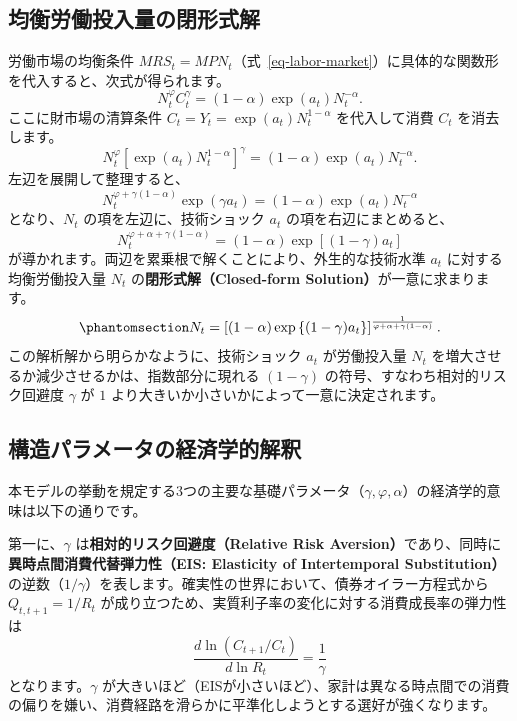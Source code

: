\documentclass[
  japanese,
  lualatex,
  ja=standard,
  12pt,
  a4paper]{ltjsarticle}
\begin{document}
\subsection{均衡労働投入量の閉形式解}\label{ux5747ux8861ux52b4ux50cdux6295ux5165ux91cfux306eux9589ux5f62ux5f0fux89e3}

労働市場の均衡条件
\(MRS_t = MPN_t\)（式~\ref{eq-labor-market}）に具体的な関数形を代入すると、次式が得られます。
\[
N_t^\varphi C_t^\gamma = (1-\alpha) \exp(a_t) N_t^{-\alpha}.
\] ここに財市場の清算条件 \(C_t = Y_t = \exp(a_t) N_t^{1-\alpha}\)
を代入して消費 \(C_t\) を消去します。 \[
N_t^\varphi \left[ \exp(a_t) N_t^{1-\alpha} \right]^\gamma = (1-\alpha) \exp(a_t) N_t^{-\alpha}.
\] 左辺を展開して整理すると、 \[
N_t^{\varphi + \gamma(1-\alpha)} \exp(\gamma a_t) = (1-\alpha) \exp(a_t) N_t^{-\alpha}
\] となり、\(N_t\) の項を左辺に、技術ショック \(a_t\)
の項を右辺にまとめると、 \[
N_t^{\varphi + \alpha + \gamma(1-\alpha)} = (1-\alpha) \exp\left[ (1-\gamma) a_t \right]
\] が導かれます。両辺を累乗根で解くことにより、外生的な技術水準 \(a_t\)
に対する均衡労働投入量 \(N_t\) の\textbf{閉形式解（Closed-form
Solution）}が一意に求まります。
\begin{equation}\protect\phantomsection\label{eq-labor-level}{
N_t = \left[ (1-\alpha) \exp\left\{ (1-\gamma) a_t \right\} \right]^{\frac{1}{\varphi + \alpha + \gamma(1-\alpha)}}.
}\end{equation} この解析解から明らかなように、技術ショック \(a_t\)
が労働投入量 \(N_t\) を増大させるか減少させるかは、指数部分に現れる
\((1-\gamma)\) の符号、すなわち相対的リスク回避度 \(\gamma\) が \(1\)
より大きいか小さいかによって一意に決定されます。

\subsection{構造パラメータの経済学的解釈}\label{ux69cbux9020ux30d1ux30e9ux30e1ux30fcux30bfux306eux7d4cux6e08ux5b66ux7684ux89e3ux91c8}

本モデルの挙動を規定する3つの主要な基礎パラメータ（\(\gamma, \varphi, \alpha\)）の経済学的意味は以下の通りです。

第一に、\(\gamma\) は\textbf{相対的リスク回避度（Relative Risk
Aversion）}であり、同時に\textbf{異時点間消費代替弾力性（EIS: Elasticity
of Intertemporal
Substitution）}の逆数（\(1/\gamma\)）を表します。確実性の世界において、債券オイラー方程式から
\(Q_{t,t+1} = 1/R_t\)
が成り立つため、実質利子率の変化に対する消費成長率の弾力性は \[
\frac{d\ln(C_{t+1}/C_t)}{d\ln R_t} = \frac{1}{\gamma}
\] となります。\(\gamma\)
が大きいほど（EISが小さいほど）、家計は異なる時点間での消費の偏りを嫌い、消費経路を滑らかに平準化しようとする選好が強くなります。
\end{document}
